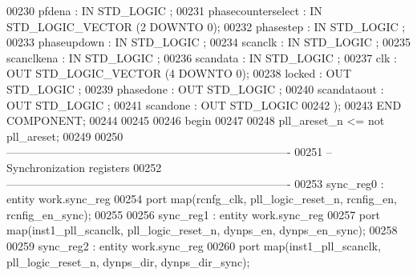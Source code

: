 \begin{DoxyCode}
00230       pfdena               : \textcolor{keywordflow}{IN} \textcolor{comment}{STD\_LOGIC} ;
00231       phasecounterselect   : \textcolor{keywordflow}{IN} \textcolor{comment}{STD\_LOGIC\_VECTOR} (\textcolor{vhdllogic}{}\textcolor{vhdllogic}{2} \textcolor{keywordflow}{DOWNTO} \textcolor{vhdllogic}{}\textcolor{vhdllogic}{0});
00232       phasestep            : \textcolor{keywordflow}{IN} \textcolor{comment}{STD\_LOGIC} ;
00233       phaseupdown          : \textcolor{keywordflow}{IN} \textcolor{comment}{STD\_LOGIC} ;
00234       scanclk              : \textcolor{keywordflow}{IN} \textcolor{comment}{STD\_LOGIC} ;
00235       scanclkena           : \textcolor{keywordflow}{IN} \textcolor{comment}{STD\_LOGIC} ;
00236       scandata             : \textcolor{keywordflow}{IN} \textcolor{comment}{STD\_LOGIC} ;
00237       clk                  : \textcolor{keywordflow}{OUT} \textcolor{comment}{STD\_LOGIC\_VECTOR} (\textcolor{vhdllogic}{}\textcolor{vhdllogic}{4} \textcolor{keywordflow}{DOWNTO} \textcolor{vhdllogic}{}\textcolor{vhdllogic}{0});
00238       locked               : \textcolor{keywordflow}{OUT} \textcolor{comment}{STD\_LOGIC} ;
00239       phasedone            : \textcolor{keywordflow}{OUT} \textcolor{comment}{STD\_LOGIC} ;
00240       scandataout          : \textcolor{keywordflow}{OUT} \textcolor{comment}{STD\_LOGIC} ;
00241       scandone             : \textcolor{keywordflow}{OUT} \textcolor{comment}{STD\_LOGIC} 
00242 );
00243 \textcolor{keywordflow}{END} \textcolor{keywordflow}{COMPONENT};
00244 
00245 
00246 \textcolor{vhdlkeyword}{begin}
00247    
00248 \textcolor{vhdlchar}{pll_areset_n}   \textcolor{vhdlchar}{<=} \textcolor{keywordflow}{not} \textcolor{vhdlchar}{pll_areset};
00249    
00250 \textcolor{keyword}{----------------------------------------------------------------------------}
00251 \textcolor{keyword}{-- Synchronization registers}
00252 \textcolor{keyword}{----------------------------------------------------------------------------  }
00253  sync\_reg0 : \textcolor{keywordflow}{entity} work.sync_reg 
00254  \textcolor{keywordflow}{port} \textcolor{keywordflow}{map}(rcnfg_clk, pll_logic_reset_n, rcnfig_en, rcnfig_en_sync\textcolor{vhdlchar}{)}; 
00255  
00256  sync\_reg1 : \textcolor{keywordflow}{entity} work.sync_reg 
00257  \textcolor{keywordflow}{port} \textcolor{keywordflow}{map}(inst1_pll_scanclk, pll_logic_reset_n, dynps_en, dynps_en_sync\textcolor{vhdlchar}{)}; 
00258  
00259  sync\_reg2 : \textcolor{keywordflow}{entity} work.sync_reg 
00260  \textcolor{keywordflow}{port} \textcolor{keywordflow}{map}(inst1_pll_scanclk, pll_logic_reset_n, dynps_dir, dynps_dir_sync\textcolor{vhdlchar}{)}; 

\end{DoxyCode}
